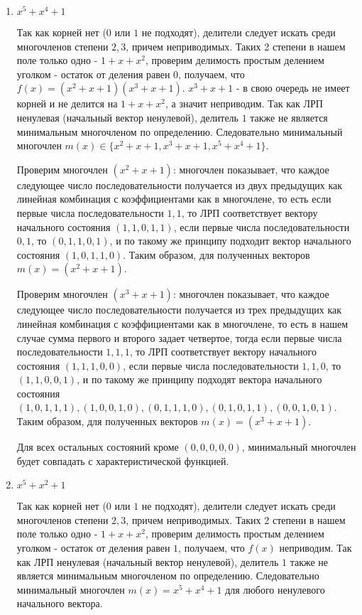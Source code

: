 \documentclass[utf8x, 14pt]{G7-32} %
\begin{document}
\begin{enumerate}
    \item $x^5+x^4+1$ \label{eq2}
    
    Так как корней нет ($0$ или $1$ не подходят), делители следует искать среди многочленов степени $2,3$, причем неприводимых. Таких 2 степени в нашем поле только одно - $1 + x + x^2$, проверим делимость простым делением уголком - остаток от деления равен $0$, получаем, что $f(x) = (x^2+x+1)(x^3+x+1)$. $x^3+x+1$ - в свою очередь не имеет корней и не делится на $1 + x + x^2$, а значит неприводим. Так как ЛРП ненулевая (начальный вектор ненулевой), делитель $1$ также не является минимальным многочленом по определению. Следовательно минимальный многочлен $m(x)\in \{x^2+x+1, x^3+x+1, x^5+x^4+1\}$.
    
    Проверим многочлен $(x^2+x+1)$:  многочлен показывает, что каждое следующее число последовательности получается из двух предыдущих как линейная комбинация с коэффициентами как в многочлене, то есть если первые числа последовательности $1,1$, то ЛРП соответствует вектору начального состояния $(1, 1, 0, 1, 1)$, если первые числа последовательности $0,1$, то $(0, 1, 1, 0, 1)$, и по такому же принципу подходит вектор начального состояния $(1,0,1,1,0)$. Таким образом, для полученных векторов $m(x) = (x^2+x+1)$. 
    
    Проверим многочлен $(x^3+x+1)$:  многочлен показывает, что каждое следующее число последовательности получается из трех предыдущих как линейная комбинация с коэффициентами как в многочлене, то есть в нашем случае сумма первого и второго задает четвертое, тогда если первые числа последовательности $1,1,1$, то ЛРП соответствует вектору начального состояния $(1, 1, 1, 0, 0)$, если первые числа последовательности $1,1,0$, то $(1, 1, 0, 0, 1)$, и по такому же принципу подходят вектора начального состояния $(1,0,1,1,1), (1,0,0,1,0), (0,1,1,1,0), (0,1,0,1,1), (0,0,1,0,1)$. Таким образом, для полученных векторов $m(x) = (x^3+x+1)$.
    
    Для всех остальных состояний кроме $(0,0,0,0,0)$, минимальный многочлен будет совпадать с характеристической функцией.
    
    \item $x^5+x^2+1$
    
    Так как корней нет ($0$ или $1$ не подходят), делители следует искать среди многочленов степени $2,3$, причем неприводимых. Таких 2 степени в нашем поле только одно - $1 + x + x^2$, проверим делимость простым делением уголком - остаток от деления равен $1$, получаем, что $f(x)$ неприводим. Так как ЛРП ненулевая (начальный вектор ненулевой), делитель $1$ также не является минимальным многочленом по определению. Следовательно минимальный многочлен $m(x) = x^5+x^4+1$ для любого ненулевого начального вектора.
    

\end{enumerate}
\end{document}

